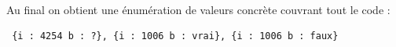 \paragraph{}Au final on obtient une énumération de valeurs concrète couvrant 
tout le code : 
\begin{verbatim}
 {i : 4254 b : ?}, {i : 1006 b : vrai}, {i : 1006 b : faux}
\end{verbatim}


